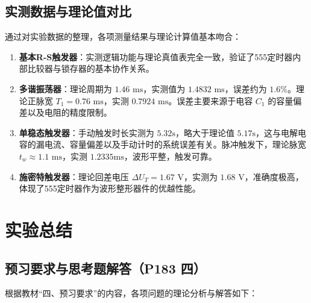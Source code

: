 \documentclass[10.5pt]{config}
\begin{document}
\subsection{实测数据与理论值对比}
通过对实验数据的整理，各项测量结果与理论计算值基本吻合：
\begin{enumerate}
    \item \textbf{基本R-S触发器}：实测逻辑功能与理论真值表完全一致，验证了555定时器内部比较器与锁存器的基本协作关系。
    \item \textbf{多谐振荡器}：理论周期为 $1.46\text{ ms}$，实测值为 $1.4832\text{ ms}$，误差约为 $1.6\%$。理论正脉宽 $T_1 = 0.76\text{ ms}$，实测 $0.7924\text{ ms}$。误差主要来源于电容 $C_1$ 的容量偏差以及电阻的精度限制。
    \item \textbf{单稳态触发器}：手动触发时长实测为 $5.32\text{s}$，略大于理论值 $5.17\text{s}$，这与电解电容的漏电流、容量偏差以及手动计时的系统误差有关。脉冲触发下，理论脉宽 $t_w \approx 1.1\text{ ms}$，实测 $1.2335\text{ms}$，波形平整，触发可靠。
    \item \textbf{施密特触发器}：理论回差电压 $\Delta U_T = 1.67\text{ V}$，实测为 $1.68\text{ V}$，准确度极高，体现了555定时器作为波形整形器件的优越性能。
\end{enumerate}



\section{实验总结}

\subsection{预习要求与思考题解答（P183 四）}
根据教材“四、预习要求”的内容，各项问题的理论分析与解答如下：
\end{document}
